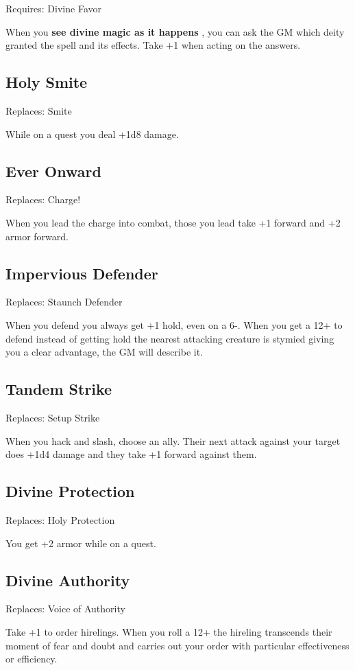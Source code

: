  Requires: Divine Favor


 When you \textbf{see divine magic as it happens}
, you can ask the GM which deity granted the spell and its effects. Take +1 when acting on the answers.
\subsection{Holy Smite}


 Replaces: Smite


 While on a quest you deal +1d8 damage.
\subsection{Ever Onward}


 Replaces: Charge!


 When you lead the charge into combat, those you lead take +1 forward and +2 armor forward.
\subsection{Impervious Defender}


 Replaces: Staunch Defender


 When you defend you always get +1 hold, even on a 6-. When you get a 12+ to defend instead of getting hold the nearest attacking creature is stymied giving you a clear advantage, the GM will describe it.
\subsection{Tandem Strike}


 Replaces: Setup Strike


 When you hack and slash, choose an ally. Their next attack against your target does +1d4 damage and they take +1 forward against them.
\subsection{Divine Protection}


 Replaces: Holy Protection


 You get +2 armor while on a quest.
\subsection{Divine Authority}


 Replaces: Voice of Authority


 Take +1 to order hirelings. When you roll a 12+ the hireling transcends their moment of fear and doubt and carries out your order with particular effectiveness or efficiency.
